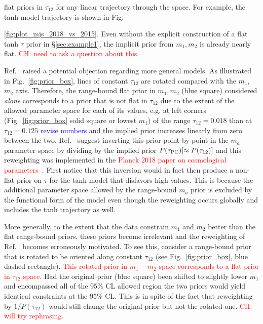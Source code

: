 \documentclass[prd,twocolumn,amsmath,amssymb,floatfix,superscriptaddress,nofootinbib]{revtex4-1}
\newcommand{\wh}[1]{\textcolor{blue}{#1}}
\newcommand{\ch}[1]{\textcolor{red}{#1}}
\begin{document}
flat priors in $\tau_{12}$ for any linear trajectory through the space.   For example, the tanh model trajectory is shown in Fig.~{\ref{fig:plot_mjs_2018_vs_2015}.   Even without the explicit 
construction of a flat tanh $\tau$ prior in \S \ref{sec:example1}, 
the implicit prior from $m_1,m_2$ is already nearly flat. \ch{CH: need to ask a question about this.}

Ref.~\cite{Millea:2018bko} raised a potential objection regarding more general models.  As illustrated in Fig.~\ref{fig:prior_box}, lines of constant $\tau_{12}$ are rotated compared with the $m_1$,
$m_2$ axis.  Therefore, the range-bound flat prior in $m_1,m_2$ (blue square) considered {\it alone} corresponds to a prior that is not flat in $\tau_{12}$ due to the extent  of the allowed parameter space
for each of its values, e.g. at  left corners (Fig.~\ref{fig:prior_box} solid square or lowest $m_1$) of the range $\tau_{12}=0.018$
than at $\tau_{12} = 0.125$ \wh{revise numbers} and the implied prior increases linearly from zero between the two.
   Ref.~\cite{Millea:2018bko} suggest 
inverting this prior point-by-point in the $m_a$ parameter space by dividing by the implied prior $P(\tau_{\rm PC}) [ \approx P(\tau_{12})]$ and this reweighting was implemented in the \ch{Planck 2018 paper on cosmological parameters~\cite{Aghanim:2018eyx}}.
First notice that this inversion would in fact then produce a non-flat prior on $\tau$ for the tanh model
that disfavors high values.   This is because
the additional parameter space allowed by the range-bound $m_a$ prior is excluded by the functional form of the model even though the reweighting occurs globally and includes the tanh trajectory as well. 

More generally, to the extent that the data constrain $m_1$ and $m_2$ better than the flat range-bound priors, these priors become irrelevant and the reweighting of Ref.~\cite{Millea:2018bko} becomes erroneously motivated.   To see this, consider a range-bound prior that is rotated to be oriented along constant $\tau_{12}$ (see Fig.~\ref{fig:prior_box}, blue dashed rectangle). \ch{This rotated prior in $m_1-m_2$ space corresponds to a flat prior in $\tau_{12}$ space.}
Had the original prior (blue square) been shifted to slightly lower
$m_1$ and encompassed all of the 95\% CL allowed
region the two priors would yield  identical constraints at the
95\% CL.   This is in spite of the fact that reweighting by $1/P(\tau_{12})$ would still change the original prior but not the
rotated one.  \ch{CH: will try rephrasing.}

}
\end{document}
